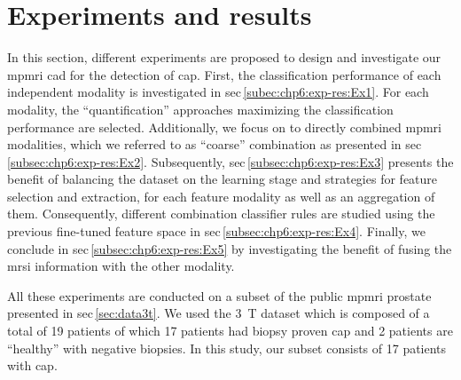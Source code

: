 \section{Experiments and results}\label{sec:chp6:exp-res}

In this section, different experiments are proposed to design and
investigate our \ac{mpmri} \ac{cad} for the detection of \ac{cap}.
First, the classification performance of each independent modality is
investigated in \acs{sec}\,\ref{subec:chp6:exp-res:Ex1}.
For each modality, the ``quantification'' approaches maximizing the
classification performance are selected.
Additionally, we focus on to directly combined \ac{mpmri} modalities,
which we referred to as ``coarse'' combination as presented in
\acs*{sec}\,\ref{subsec:chp6:exp-res:Ex2}.
Subsequently, \acs{sec}\,\ref{subsec:chp6:exp-res:Ex3} presents the
benefit of balancing the dataset on the learning stage and strategies
for feature selection and extraction, for each feature modality as
well as an aggregation of them.
Consequently, different combination classifier rules are studied using
the previous fine-tuned feature space in
\acs{sec}\,\ref{subsec:chp6:exp-res:Ex4}.
Finally, we conclude in \acs{sec}\,\ref{subsec:chp6:exp-res:Ex5} by
investigating the benefit of fusing the \ac{mrsi} information with the
other modality.

All these experiments are conducted on a subset of the public
\ac{mpmri} prostate presented in \acs{sec}\,\ref{sec:data3t}.
We used the \SI{3}{\tesla} dataset which is composed of a total of 19
patients of which 17 patients had biopsy proven \ac{cap} and 2
patients are ``healthy'' with negative biopsies.
In this study, our subset consists of 17 patients with \ac{cap}.

